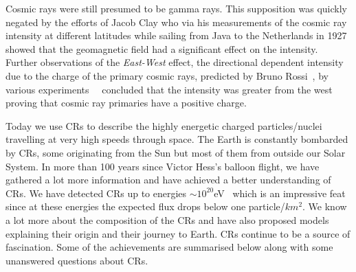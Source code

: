 Cosmic rays were still presumed to be gamma rays. This supposition was quickly negated by the efforts of Jacob Clay who via his measurements of the cosmic ray intensity at different latitudes while sailing from Java to the Netherlands in 1927~\cite{Clay:1927I} showed that the geomagnetic field had a significant effect on the intensity. Further observations of the \textit{East-West} effect, the directional dependent intensity due to the charge of the primary cosmic rays, predicted by Bruno Rossi~\cite{PhysRev.36.606}, by various experiments~\cite{PhysRev.43.834}~\cite{PhysRev.43.835} concluded that the intensity was greater from the west proving that cosmic ray primaries have a positive charge.

Today we use CRs to describe the highly energetic charged particles/nuclei travelling at very high speeds through space. The Earth is constantly bombarded by CRs, some originating from the Sun but most of them from outside our Solar System. In more than 100 years since Victor Hess's balloon flight, we have gathered a lot more information and have achieved a better understanding of CRs. We have detected CRs up to energies $\sim 10^{20}$eV~\cite{TA_2023} which is an impressive feat since at these energies the expected flux drops below one particle/$km^2$. We know a lot more about the composition of the CRs and have also proposed models explaining their origin and their journey to Earth. CRs continue to be a source of fascination. Some of the achievements are summarised below along with some unanswered questions about CRs. 

